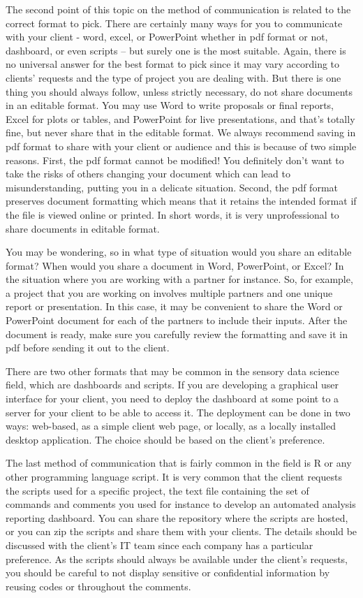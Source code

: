 \documentclass[
]{krantz}
\begin{document}
The second point of this topic on the method of communication is related to the correct format to pick. There are certainly many ways for you to communicate with your client - word, excel, or PowerPoint whether in pdf format or not, dashboard, or even scripts -- but surely one is the most suitable. Again, there is no universal answer for the best format to pick since it may vary according to clients' requests and the type of project you are dealing with. But there is one thing you should always follow, unless strictly necessary, do not share documents in an editable format. You may use Word to write proposals or final reports, Excel for plots or tables, and PowerPoint for live presentations, and that's totally fine, but never share that in the editable format. We always recommend saving in pdf format to share with your client or audience and this is because of two simple reasons. First, the pdf format cannot be modified! You definitely don't want to take the risks of others changing your document which can lead to misunderstanding, putting you in a delicate situation. Second, the pdf format preserves document formatting which means that it retains the intended format if the file is viewed online or printed. In short words, it is very unprofessional to share documents in editable format.

You may be wondering, so in what type of situation would you share an editable format? When would you share a document in Word, PowerPoint, or Excel? In the situation where you are working with a partner for instance. So, for example, a project that you are working on involves multiple partners and one unique report or presentation. In this case, it may be convenient to share the Word or PowerPoint document for each of the partners to include their inputs. After the document is ready, make sure you carefully review the formatting and save it in pdf before sending it out to the client.

There are two other formats that may be common in the sensory data science field, which are dashboards and scripts. If you are developing a graphical user interface for your client, you need to deploy the dashboard at some point to a server for your client to be able to access it. The deployment can be done in two ways: web-based, as a simple client web page, or locally, as a locally installed desktop application. The choice should be based on the client's preference.

The last method of communication that is fairly common in the field is R or any other programming language script. It is very common that the client requests the scripts used for a specific project, the text file containing the set of commands and comments you used for instance to develop an automated analysis reporting dashboard. You can share the repository where the scripts are hosted, or you can zip the scripts and share them with your clients. The details should be discussed with the client's IT team since each company has a particular preference. As the scripts should always be available under the client's requests, you should be careful to not display sensitive or confidential information by reusing codes or throughout the comments.
\end{document}
